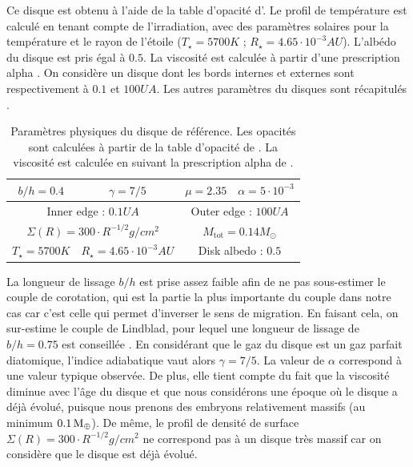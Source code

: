 Ce disque est obtenu à l'aide de la table d'opacité d'\cite{hure2000transition}. Le profil de température est
calculé en tenant compte de l'irradiation, avec des paramètres solaires pour la température et le rayon de l'étoile ($T_\star =
5700\unit{K}$ ; $R_\star = 4.65\cdot 10^{-3}\unit{AU}$). L'albédo du disque est pris égal à $0.5$. La viscosité est calculée à
partir d'une prescription alpha \citep{shakura1973black}. On considère un disque dont les bords internes et externes sont
respectivement à $0.1$ et $100\unit{UA}$. Les autres paramètres du disques sont récapitulés . 

\begin{table}[htbp]
\centering
\begin{tabular}{|c|c|c|c|}
\hline
$b/h = 0.4$ & $\gamma = 7/5$ & $\mu = 2.35$ & $\alpha = 5\cdot 10^{-3}$ \\\hline
\multicolumn{2}{|c|}{Inner edge : $0.1\unit{UA}$} & \multicolumn{2}{c|}{Outer edge : $100\unit{UA}$}\\\hline
\multicolumn{2}{|c|}{$\Sigma(R) = 300 \cdot R^{-1/2}\unit{g/cm^2}$}& \multicolumn{2}{c|}{$M_\text{tot} = 0.14\unit{M_\odot}$}\\\hline
$T_\star = 5700\unit{K}$ & $R_\star = 4.65\cdot 10^{-3}\unit{AU}$ & \multicolumn{2}{c|}{Disk albedo : $0.5$}\\\hline
\end{tabular}
\caption{Paramètres physiques du disque de référence. Les opacités sont calculées à partir de la table d'opacité de
\cite{hure2000transition}. La viscosité est calculée en suivant la prescription alpha de
\cite{shakura1973black}.}\label{tab:fiducial_parameters}
\end{table}

La longueur de lissage $b/h$ est prise assez faible afin de ne pas sous-estimer le couple de corotation, qui est la partie la plus importante du couple dans notre cas car c'est celle qui permet d'inverser le sens de migration. En faisant cela, on sur-estime le couple de Lindblad, pour lequel une longueur de lissage de $b/h=0.75$ est conseillée \citep{masset2002coorbital}.
En considérant que le gaz du disque est un gaz parfait diatomique, l'indice adiabatique vaut alors $\gamma=7/5$.
La valeur de $\alpha$ correspond à une valeur typique observée. De plus, elle tient compte du fait que la viscosité diminue avec l'âge du disque et que nous considérons une époque où le disque a déjà évolué, puisque nous prenons des embryons relativement massifs (au minimum $0.1\mathrm{\thinspace M_\oplus}$). De même, le profil de densité de surface $\Sigma(R) = 300 \cdot R^{-1/2}\unit{g/cm^2}$ ne correspond pas à un disque très massif car on considère que le disque est déjà évolué. 

